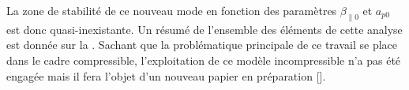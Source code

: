 La zone de stabilité de ce nouveau mode en fonction des paramètres $\beta_{\parallel 0}$ et $a_{p0}$ est donc quasi-inexistante. Un résumé de l'ensemble des éléments de cette analyse est donnée sur la . Sachant que la problématique principale de ce travail se place dans le cadre compressible, l'exploitation de ce modèle incompressible n'a pas été engagée mais il fera l'objet d'un nouveau papier en préparation [\cite{simon_article_2023}]. 





